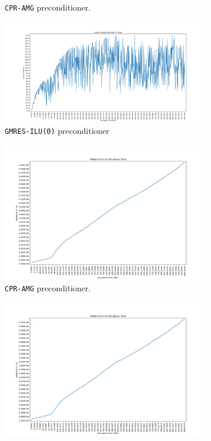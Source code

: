\begin{figure}
\begin{subfigure}{.5\textwidth}
  \caption{\texttt{CPR-AMG} preconditioner.}
	\label{case8_its_cpr}
\end{subfigure}%
\begin{subfigure}{.5\textwidth}
  \centering
  \includegraphics[width=1.1\linewidth]{figures/case8/ilu/its_time.png_reduced.png}
  \caption{\texttt{GMRES-ILU(0)} preconditioner}
	\label{case8_its_ilu}
\end{subfigure}
\begin{subfigure}{.5\textwidth}
  \centering
  \includegraphics[width=1.1\linewidth]{figures/case8/cpr/matbalerr_time.png_reduced.png}
  \caption{\texttt{CPR-AMG} preconditioner.}
	\label{case8_matbalerr_cpr}
\end{subfigure}%
\begin{subfigure}{.5\textwidth}
  \centering
  \includegraphics[width=1.1\linewidth]{figures/case8/ilu/matbalerr_time.png_reduced.png}

\end{subfigure}
\end{figure}
